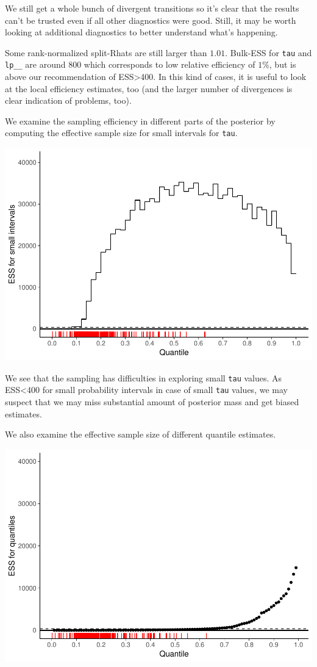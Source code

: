 \documentclass[american,]{article}
\begin{document}
We still get a whole bunch of divergent transitions so it's clear that
the results can't be trusted even if all other diagnostics were good.
Still, it may be worth looking at additional diagnostics to better
understand what's happening.

Some rank-normalized split-Rhats are still larger than \(1.01\).
Bulk-ESS for \texttt{tau} and \texttt{lp\_\_} are around 800 which
corresponds to low relative efficiency of \(1\%\), but is above our
recommendation of ESS\textgreater{}400. In this kind of cases, it is
useful to look at the local efficiency estimates, too (and the larger
number of divergences is clear indication of problems, too).

We examine the sampling efficiency in different parts of the posterior
by computing the effective sample size for small intervals for
\texttt{tau}.

\includegraphics{graphics/local-ess-fit-cp2-tau-1.pdf}

We see that the sampling has difficulties in exploring small
\texttt{tau} values. As ESS\textless{}400 for small probability
intervals in case of small \texttt{tau} values, we may suspect that we
may miss substantial amount of posterior mass and get biased estimates.

We also examine the effective sample size of different quantile
estimates.

\includegraphics{graphics/quantile-ess-fit-cp2-tau-1.pdf}
\end{document}
